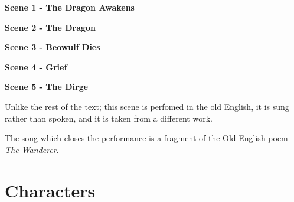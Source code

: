\documentclass[a4paper]{article}
\begin{document}
{\centerline{\textbf{Scene 1 - The Dragon Awakens}}

\centerline{\textbf{Scene 2 - The Dragon}}

\centerline{\textbf{Scene 3 - Beowulf Dies}}

\centerline{\textbf{Scene 4 - Grief}}

\centerline{\textbf{Scene 5 - The Dirge}}

Unlike the rest of the text; this scene is perfomed in the old English, it is sung 
rather than spoken, and it is taken from a different work.

The song which closes the performance is a fragment of the Old English poem \textit{The Wanderer}.

}

\section{Characters}
\end{document}
